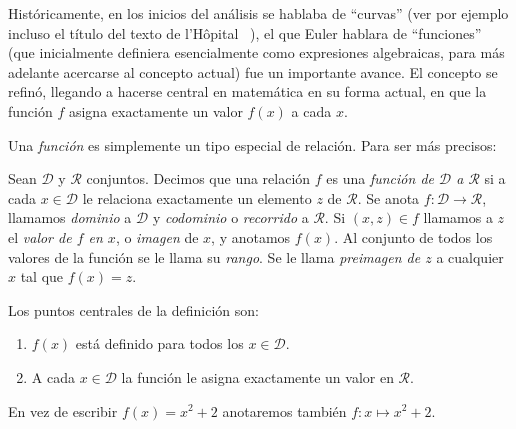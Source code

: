   Históricamente,
  en los inicios del análisis se hablaba de ``curvas''
  (ver por ejemplo incluso el título del texto de l'Hôpital~%
    \cite{lHopital96:_analy_infin_petit_lignes_courb}),
  el que Euler hablara de ``funciones''
  (que inicialmente definiera esencialmente como expresiones algebraicas,
   para más adelante acercarse al concepto actual)
  fue un importante avance.
  El concepto se refinó,
  llegando a hacerse central en matemática
  en su forma actual,
  en que la función \(f\) asigna exactamente un valor \(f(x)\)
  a cada \(x\).

  Una \emph{función} es simplemente un tipo especial de relación.
  Para ser más precisos:
  \begin{definition}
    Sean \(\mathcal{D}\) y \(\mathcal{R}\) conjuntos.
    Decimos que una relación \(f\)
    es una \emph{función de \(\mathcal{D}\) a \(\mathcal{R}\)}
    si a cada \(x \in \mathcal{D}\)
    le relaciona exactamente un elemento \(z\) de \(\mathcal{R}\).
    Se anota \(f \colon \mathcal{D} \rightarrow \mathcal{R}\),
    llamamos \emph{dominio} a \(\mathcal{D}\)%
    y \emph{codominio}%
    o \emph{recorrido}%
    a \(\mathcal{R}\).
    Si \((x, z) \in f\) llamamos a \(z\) el \emph{valor de \(f\) en \(x\)},
    o \emph{imagen} de \(x\),%
    y anotamos \(f(x)\).
    Al conjunto de todos los valores de la función
    se le llama su \emph{rango}.%
    Se le llama \emph{preimagen de \(z\)}%
    a cualquier \(x\) tal que \(f(x) = z\).
  \end{definition}

  Los puntos centrales de la definición son:
  \begin{enumerate}
  \item
    \(f(x)\) está definido para todos los \(x \in \mathcal{D}\).
  \item
    A cada \(x \in \mathcal{D}\)
    la función le asigna exactamente un valor en \(\mathcal{R}\).
  \end{enumerate}
  En vez de escribir \(f(x) = x^2 + 2\)
  anotaremos también \(f \colon x \mapsto x^2 + 2\).


